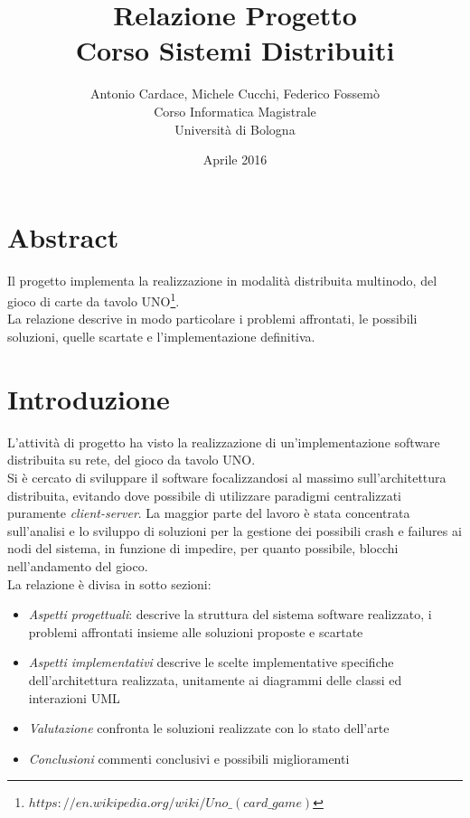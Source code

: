 \documentclass[10pt,a4paper]{article}
\begin{document}
\title{Relazione Progetto\\Corso Sistemi Distribuiti}
\author{Antonio Cardace, Michele Cucchi, Federico Fossemò\\Corso Informatica Magistrale\\Università di Bologna}
\date{Aprile 2016}
\maketitle

\section{Abstract}
Il progetto implementa la realizzazione in modalità distribuita multinodo, del gioco di carte da tavolo UNO\footnote{$https://en.wikipedia.org/wiki/Uno\_(card\_game)$}. \\La relazione descrive in modo particolare i problemi affrontati, le possibili soluzioni, quelle scartate e l'implementazione definitiva.

\section{Introduzione}
L'attività di progetto ha visto la realizzazione di un'implementazione software distribuita su rete, del gioco da tavolo UNO.\\ Si è cercato di sviluppare il software focalizzandosi al massimo sull'architettura distribuita, evitando dove possibile di utilizzare paradigmi centralizzati puramente \textit{client-server}. La maggior parte del lavoro è stata concentrata sull'analisi e lo sviluppo di soluzioni per la gestione dei possibili crash e failures ai nodi del sistema, in funzione di impedire, per quanto possibile, blocchi nell'andamento del gioco. \\ La relazione è divisa in sotto sezioni: \begin{itemize}\item \textit{Aspetti progettuali}: descrive la struttura del sistema software realizzato, i problemi affrontati insieme alle soluzioni proposte e scartate\item \textit{Aspetti implementativi} descrive le scelte implementative specifiche dell'architettura realizzata, unitamente ai diagrammi delle classi ed interazioni UML\item \textit{Valutazione} confronta le soluzioni realizzate con lo stato dell'arte\item \textit{Conclusioni} commenti conclusivi e possibili miglioramenti\end{itemize}
\end{document}
